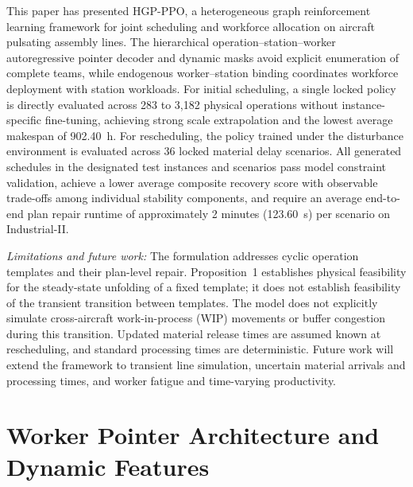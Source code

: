 \documentclass[journal,10pt]{IEEEtran}
\begin{document}
This paper has presented HGP-PPO, a heterogeneous graph reinforcement learning framework for joint scheduling and workforce allocation on aircraft pulsating assembly lines. The hierarchical operation--station--worker autoregressive pointer decoder and dynamic masks avoid explicit enumeration of complete teams, while endogenous worker--station binding coordinates workforce deployment with station workloads. For initial scheduling, a single locked policy is directly evaluated across 283 to 3,182 physical operations without instance-specific fine-tuning, achieving strong scale extrapolation and the lowest average makespan of 902.40~h. For rescheduling, the policy trained under the disturbance environment is evaluated across 36 locked material delay scenarios. All generated schedules in the designated test instances and scenarios pass model constraint validation, achieve a lower average composite recovery score with observable trade-offs among individual stability components, and require an average end-to-end plan repair runtime of approximately 2 minutes (123.60~s) per scenario on Industrial-II.

\textit{Limitations and future work:}
The formulation addresses cyclic operation templates and their plan-level repair. Proposition~1 establishes physical feasibility for the steady-state unfolding of a fixed template; it does not establish feasibility of the transient transition between templates. The model does not explicitly simulate cross-aircraft work-in-process (WIP) movements or buffer congestion during this transition. Updated material release times are assumed known at rescheduling, and standard processing times are deterministic. Future work will extend the framework to transient line simulation, uncertain material arrivals and processing times, and worker fatigue and time-varying productivity.

\appendices

\section{Worker Pointer Architecture and Dynamic Features}\label{app:worker_pointer}
\end{document}
